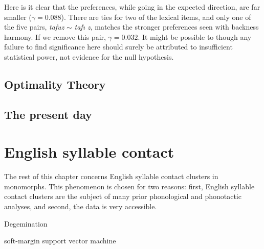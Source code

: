 Here is it clear that the preferences, while going in the expected direction, are far smaller ($\gamma = 0.088$). There are ties for two of the lexical items, and only one of the five pairs, \emph{tafuz} $\sim$ \emph{tafı z}, matches the stronger preferences seen with backness harmony. If we remove this pair, $\gamma = 0.032$.  It might be possible to though any failure to find significance here should surely be attributed to insufficient statistical power, not evidence for the null hypothesis. 

\subsection{Optimality Theory}

\subsection{The present day}

\section{English syllable contact}

The rest of this chapter concerns English syllable contact clusters in monomorphs. This phenomenon is chosen for two reasons: first, English syllable contact clusters are the subject of many prior phonological and phonotactic analyses, and second, the data is very accessible.


Degemination

\citet[][20]{Harris1994}

soft-margin support vector machine \citep{Cortes1995}
